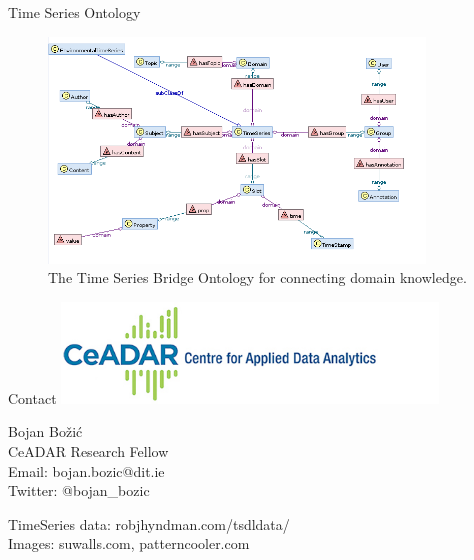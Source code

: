 \documentclass{beamer}
\begin{document}
\begin{frame}{Time Series Ontology}
\begin{figure}
\centering
\includegraphics[width=10cm]{bridge}
\caption{The Time Series Bridge Ontology for connecting domain knowledge.}
\end{figure}
\end{frame}

\begin{frame}{Contact}
\includegraphics[width=10cm]{ceadar} 
\begin{flushleft}
Bojan Bo\v{z}i\'{c} \\
CeADAR Research Fellow \\
Email: bojan.bozic@dit.ie \\
Twitter: @bojan\_bozic 
\end{flushleft}
\begin{flushleft}
TimeSeries data: robjhyndman.com/tsdldata/ \\
Images: suwalls.com, patterncooler.com
\end{flushleft}
\end{frame}

\end{document}
